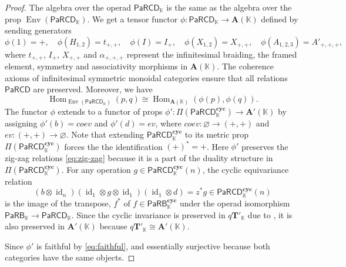 \documentclass{amsart}
\newcommand{\bT}{\mathbf{T}}
\newcommand{\bA}{\mathbf{A}}
\newcommand{\kk}{\mathbb{K}}    %
\newcommand{\PaRB}{\mathsf{PaRB}}
\newcommand{\PaRCD}{\mathsf{PaRCD}}
\newcommand{\RCD}{\mathsf{RCD}}
\newcommand{\hRCD}{{\RCD}_{\kk}}
\newcommand{\hPaRCD}{{\PaRCD}_{\kk}}
\newcommand{\cyc}{\mathbf{cyc}}
\newcommand{\id}{\operatorname{id}}
\newcommand{\Hom}{\operatorname{Hom}}
\newcommand{\Env}{\operatorname{Env}}
\newcommand{\lrar}{\ensuremath{\longrightarrow}}
\theoremstyle{definition}
\numberwithin{equation}{section}
\begin{document}
\begin{proof}
The algebra over the operad $\hPaRCD$ is the same as the algebra over the prop $\Env(\hPaRCD)$. We get a tensor functor $\phi: \hPaRCD \lrar \bA(\kk)$ defined by sending generators \[ \phi(1) = +, \quad \phi(H_{1,2}) = t_{+,+}, \quad \phi(I) = I_{+}, \quad \phi(X_{1,2}) = X_{+,+}, \quad \phi(A_{1,2,3}) = A'_{+,+,+}, \] where $t_{+,+}$, $I_{+}$, $X_{+,+}$ and $\alpha_{+,+,+}$ represent the infinitesimal braiding, the framed element, symmetry and associativity morphisms in $\bA(\kk)$. The coherence axioms of infinitesimal symmetric monoidal categories ensure that all relations $\PaRCD$ are preserved. Moreover, we have 
\begin{equation}\label{eq:faithful}
    \Hom_{\Env(\hPaRCD)}(p,q) \cong \Hom_{\bA(\kk)}(\phi(p),\phi(q)).
\end{equation}
The functor $\phi$ extends to a functor of props $\phi': \Pi(\hPaRCD^{\cyc}) \lrar \bA'(\kk)$ by assigning $\phi'(b) = coev$ and $\phi'(d) = ev$, where $coev: \varnothing \lrar (+,+)$ and $ev: (+,+) \lrar \varnothing$. Note that extending $\hPaRCD^{\cyc}$ to its metric prop $\Pi(\hPaRCD^{\cyc})$ forces the the identification $(+)^* = +$. Here $\phi'$ preserves the zig-zag relations \eqref{eq:zig-zag} because it is a part of the duality structure in $\Pi(\hPaRCD^{\cyc})$.
For any operation $g\in \hPaRCD^{\cyc}(n)$, the cyclic equivariance relation \[ (b\otimes \id_n)(\id_1 \otimes g \otimes \id_1) (\id_1 \otimes d) = z^* g \in \hPaRCD^{\cyc}(n)\] is the image of the transpose,
$f^*$ of $f \in \PaRB^{\cyc}_{\kk}$ under the operad isomorphism $\PaRB_{\kk} \lrar \hPaRCD$. Since the cyclic invariance is preserved in $q\bT'_{\kk}$ due to \cite[Proposition 6.5]{RS2025cyclicgt}, it is also preserved in $\bA'(\kk)$ because $q\bT'_{\kk} \cong \bA'(\kk)$.

Since $\phi'$ is faithful by \eqref{eq:faithful}, and essentially surjective because both categories have the same objects.

\end{proof}
\end{document}

